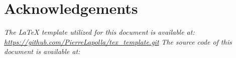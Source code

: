 \maketitle
\tableofcontents


\section*{Acknowledgements}\label{sec:acknowledgements}

\vfill
\begin{center}
    \textit{The \LaTeX{} template utilized for this document is available at:
    \url{https://github.com/PierreLapolla/tex_template.git}}
    \textit{The source code of this document is available at:
    \url{}}
\end{center}
\newpage
